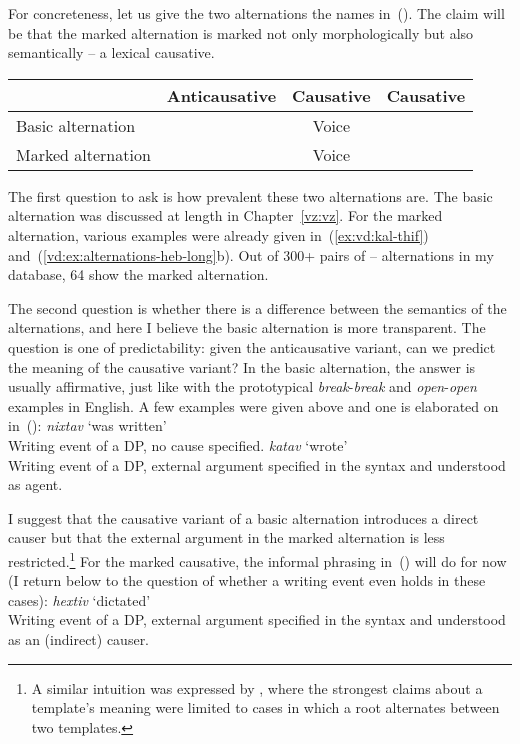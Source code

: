 For concreteness, let us give the two alternations the names in~(\nextx). The claim will be that the marked alternation is marked not only morphologically but also semantically -- a lexical causative.
\ex
\begin{tabular}{l|ccc}
	&	Anticausative & Causative & Causative\\\hline
Basic alternation	& {\vz} & Voice &   \\
Marked alternation		&		&  Voice & {\vd}\\
\end{tabular}
\xe

The first question to ask is how prevalent these two alternations are. The basic alternation was discussed at length in Chapter~\ref{vz:vz}. For the marked alternation, various examples were already given in~(\ref{ex:vd:kal-thif}) and~(\ref{vd:ex:alternations-heb-long}b). Out of 300+ pairs of {\tkal}--{\thif} alternations in my database, 64 show the marked alternation.%

%
%

The second question is whether there is a difference between the semantics of the alternations, and here I believe the basic alternation is more transparent. The question is one of predictability: given the anticausative variant, can we predict the meaning of the causative variant? In the basic alternation, the answer is usually affirmative, just like with the prototypical \emph{break}-\emph{break} and \emph{open}-\emph{open} examples in English. A few examples were given  above and one is elaborated on in~(\nextx):
\pex
	\a \emph{nixtav} `was written'\\
		Writing event of a DP, no cause specified.
	\a \emph{katav} `wrote'\\
		Writing event of a DP, external argument specified in the syntax and understood as agent.
\xe

I suggest that the causative variant of a basic alternation introduces a direct causer \citep{bittner99,kratzer05} but that the external argument in the marked alternation is less restricted.\footnote{A similar intuition was expressed by \citep{doron03}, where the strongest claims about a template's meaning were limited to cases in which a root alternates between two templates.} For the marked causative, the informal phrasing in~(\nextx) will do for now (I return below to the question of whether a writing event even holds in these cases):
\ex \emph{hextiv} `dictated'\\
	Writing event of a DP, external argument specified in the syntax and understood as an (indirect) causer.
\xe


